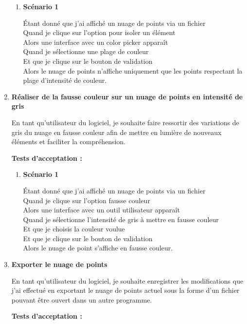 \documentclass[12pt,titlepage,french]{article}
\begin{document}
\begin{enumerate}
\begin{enumerate}
    \item \textbf{Scénario 1}

Étant donné que j'ai affiché un nuage de points via un fichier\\
Quand je clique sur l'option pour isoler un élément\\
Alors une interface avec un color picker apparaît\\
Quand je sélectionne une plage de couleur\\
Et que je clique sur le bouton de validation\\
Alors le nuage de points n'affiche uniquement que les points respectant la plage d'intensité de couleur.

\end{enumerate}
\item \textbf{Réaliser de la fausse couleur sur un nuage de points en intensité de gris}

En tant qu'utilisateur du logiciel, je souhaite faire ressortir des variations de gris du nuage en fausse couleur afin de mettre en lumière de nouveaux éléments et faciliter la compréhension.

\textbf{Tests d'acceptation :}

\begin{enumerate}
    \item \textbf{Scénario 1}

Étant donné que j'ai affiché un nuage de points via un fichier\\
Quand je clique sur l'option fausse couleur\\
Alors une interface avec un outil utilisateur apparaît\\
Quand je sélectionne l'intensité de gris à mettre en fausse couleur\\
Et que je choisis la couleur voulue\\
Et que je clique sur le bouton de validation\\
Alors le nuage de point s'affiche en fausse couleur.
\end{enumerate}

\item \textbf{Exporter le nuage de points}

En tant qu'utilisateur du logiciel, je souhaite enregistrer les modifications que j'ai effectué en exportant le nuage de points actuel sous la forme d'un fichier pouvant être ouvert dans un autre programme.

\textbf{Tests d'acceptation :}


\end{enumerate}
\end{document}
